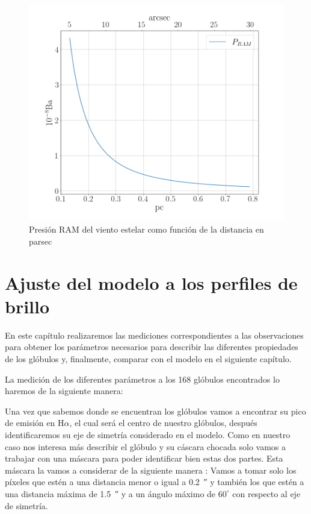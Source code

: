 \documentclass{book}
\begin{document}
\begin{figure}[htb]
    \centering
    \includegraphics[width=\textwidth]{images Chapter 3/C3_PRAM.png}
    \caption{Presión RAM del viento estelar como función de la distancia en parsec}
    \label{P_RAM}
\end{figure}

\chapter{Ajuste del modelo a los perfiles de brillo}\label{Chapter : Ajuste}

En este capítulo realizaremos las mediciones correspondientes a las observaciones para obtener los parámetros necesarios para describir las diferentes propiedades de los glóbulos y, finalmente, comparar con el modelo en el siguiente capítulo.

La medición de los diferentes parámetros a los 168 glóbulos encontrados lo haremos de la siguiente manera:

Una vez que sabemos donde se encuentran los glóbulos vamos a encontrar su pico de emisión en H$\alpha$, el cual será el centro de nuestro glóbulos, después identificaremos su eje de simetría considerado en el modelo. Como en nuestro caso nos interesa más describir el glóbulo y su cáscara chocada solo vamos a trabajar con una máscara para poder identificar bien estas dos partes. Esta máscara la vamos a considerar de la siguiente manera : Vamos a tomar solo los píxeles que estén a una distancia menor o igual a \SI{0.2}{\arcsecond} y también los que estén a una distancia máxima de \SI{1.5}{\arcsecond} y a un ángulo máximo de $60^\circ$ con respecto al eje de simetría. 
\end{document}
